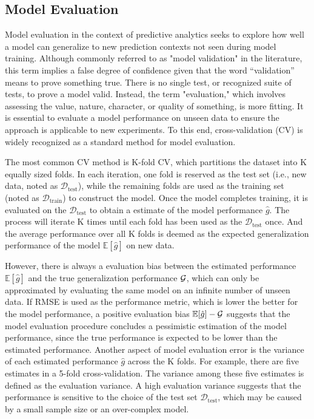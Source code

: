 \subsection{Model Evaluation}

Model evaluation in the context of predictive analytics seeks to explore how well a model can generalize to new prediction contexts not seen during model training. Although commonly referred to as "model validation" in the literature, this term implies a false degree of confidence given that the word “validation” means to prove something true. There is no single test, or recognized suite of tests, to prove a model valid. Instead, the term "evaluation," which involves assessing the value, nature, character, or quality of something, is more fitting. It is essential to evaluate a model performance on unseen data to ensure the approach is applicable to new experiments. To this end, cross-validation (CV) is widely recognized as a standard method for model evaluation.

The most common CV method is K-fold CV, which partitions the dataset into K equally sized folds. In each iteration, one fold is reserved as the test set (i.e., new data, noted as $\mathcal{D}_{\text{test}}$), while the remaining folds are used as the training set (noted as $\mathcal{D}_{\text{train}}$) to construct the model. Once the model completes training, it is evaluated on the $\mathcal{D}_{\text{test}}$ to obtain a estimate of the model performance $\hat{g}$. The process will iterate K times until each fold has been used as the $\mathcal{D}_{\text{test}}$ once. And the average performance over all K folds is deemed as the expected generalization performance of the model $\mathbb{E}[\hat{g}]$ on new data.

However, there is always a evaluation bias between the estimated performance $\mathbb{E}[\hat{g}]$ and the true generalization performance $\cal{G}$, which can only be approximated by evaluating the same model on an infinite number of unseen data. If RMSE is used as the performance metric, which is lower the better for the model performance, a positive evaluation bias $\mathbb{E}[\hat{g}] - \cal{G}$ suggests that the model evaluation procedure concludes a pessimistic estimation of the model performance, since the true performance is expected to be lower than the estimated performance. Another aspect of model evaluation error is the variance of each estimated performance $\hat{g}$ across the K folds. For example, there are five estimates in a 5-fold cross-validation. The variance among these five estimates is defined as the evaluation variance. A high evaluation variance suggests that the performance is sensitive to the choice of the test set $\mathcal{D}_\text{test}$, which may be caused by a small sample size or an over-complex model.


